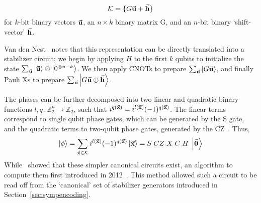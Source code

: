 \[
    \mathcal{K}=\{G\va{u} + \va{h}\}
\]
for $k$-bit binary vectors $\va{u}$, an $n\times k$ binary matrix G, and an $n$-bit binary `shift-vector' $\va{h}$.\par
Van den Nest~\cite{VandenNest2008} notes that this representation can be directly translated into a stabilizer circuit; we begin by applying $H$ to the first $k$ qubits to initialize the state $\sum_{\va{u}}\ket{\va{u}}\otimes\ket{0^{\otimes n-k}}$. We then apply CNOTs to prepare $\sum_{\va{u}}\ket{G\va{u}}$, and finally Pauli Xs to prepare $\sum_{\va{u}}\ket{G\va{u}\oplus \va{h}}$.\par
The phases can be further decomposed into two linear and quadratic binary functions $l,q\,:\mathbb{Z}_{2}^{n}\rightarrow\mathbb{Z}_{2}$, such that $i^{q(\va{x})}=i^{l(\va{x})}(-1)^{q(\va{x})}$. The linear terms correspond to single qubit phase gates, which can be generated by the S gate, and the quadratic terms to two-qubit phase gates, generated by the CZ~\cite{VandenNest2008}. Thus,
\begin{equation}
\ket{\phi}=\sum_{\va{x}\in\mathcal{K}}i^{l(\va{x})}(-1)^{q(\va{x})}\ket{\va{x}} = S\;CZ\;X\;C\;H\;\ket{\va{0}}
\label{eq:expandedaffinecirc}
\end{equation}
While~\cite{VandenNest2008} showed that these simpler canonical circuits exist, an algorithm to compute them first introduced in 2012~\cite{Garcia2012}. This method allowed such a circuit to be read off from the `canonical' set of stabilizer generators introduced in Section~\ref{sec:sympencoding}. 
